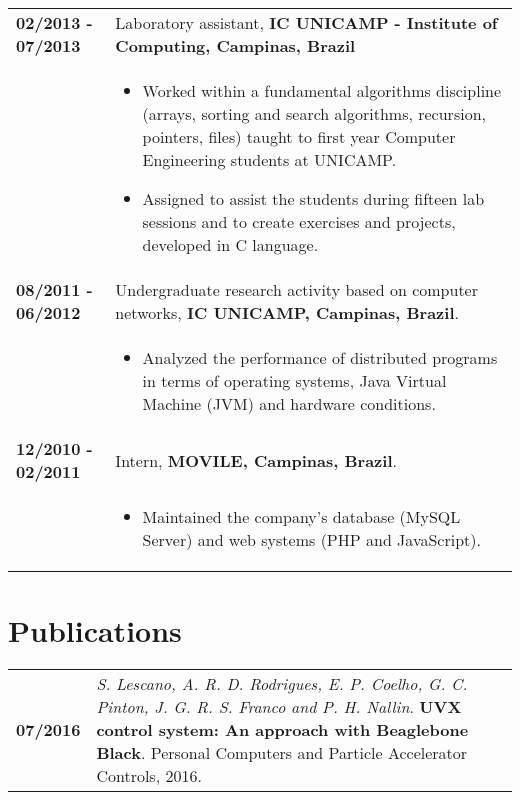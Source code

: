 \documentclass[10pt, a4paper]{article}
\begin{document}
\begin{tabular}{p{} p{}}
 \textbf{02/2013 - 07/2013}   & Laboratory assistant, \textbf{IC UNICAMP -
 Institute of Computing, Campinas, Brazil} \\
 & \vspace{-12pt} 
	 \begin {itemize} 
	   	\item Worked within a fundamental algorithms discipline (arrays, sorting and search algorithms, recursion, pointers, files)
	 taught to first year Computer Engineering students at UNICAMP. \vspace{-4pt}
	 	\item Assigned to assist the students during fifteen lab sessions and to
	 create exercises and projects, developed in C language.
	 \end{itemize} \\

 \textbf{08/2011 - 06/2012} & Undergraduate research activity based on computer
 networks, \textbf{IC UNICAMP, Campinas, Brazil}.   \\
 & 
 	\vspace{-12pt}
	\begin{itemize}
   	\item Analyzed the performance of distributed programs in terms of
 		operating systems, Java Virtual Machine (JVM) and hardware conditions.
 	\end{itemize} \\
 
 
 \textbf{12/2010 - 02/2011} & Intern, \textbf{MOVILE, Campinas, Brazil}.\\
 &
 \vspace{-12pt}
	\begin{itemize} 
 	\item Maintained the company’s database (MySQL Server) and web systems (PHP
 	and JavaScript).  
	\end {itemize} 	\\
 
\end{tabular}


\section{Publications}

\begin{tabular}{p{} p{}}

\textbf{07/2016}  & \textit{S. Lescano, A. R. D. Rodrigues, E. P.
Coelho, G. C. Pinton, J. G. R. S. Franco and P. H. Nallin}. \textbf{UVX
control system: An approach with Beaglebone Black}. Personal Computers and
Particle Accelerator Controls, 2016. \\

\end{tabular}
\end{document}
